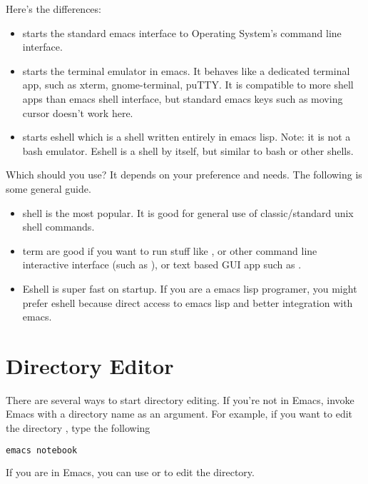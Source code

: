 Here's the differences:
\begin{itemize}
\item {} starts the standard emacs interface to Operating System's command line interface.

\item {} starts the terminal emulator in emacs.
It behaves like a dedicated terminal app, such as xterm, gnome-terminal, puTTY.
It is compatible to more shell apps than emacs shell interface, but standard emacs keys such as moving cursor doesn't work here.

\item {} starts eshell which is a shell written entirely in emacs lisp.
Note: it is not a bash emulator.
Eshell is a shell by itself, but similar to bash or other shells.

\end{itemize}

Which should you use?
It depends on your preference and needs.
The following is some general guide.

\begin{itemize}
\item shell is the most popular. It is good for general use of classic/standard unix shell commands.
\item term are good if you want to run stuff like , or other command line interactive interface (such as ), or text based GUI app such as .
\item Eshell is super fast on startup. If you are a emacs lisp programer, you might prefer eshell because direct access to emacs lisp and better integration with emacs.
\end{itemize}




\section{Directory Editor}
\label{sec:directory-editor}

There are several ways to start directory editing.
If you're not in Emacs, invoke Emacs with a directory name as an argument.
For example, if you want to edit the directory , type the following
\begin{lstlisting}[language=sh]
emacs notebook
\end{lstlisting}
If you are in Emacs, you can use  or  to edit the directory.

